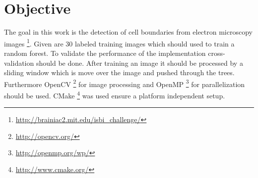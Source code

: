 \section{Objective}
\label{sec:objective}

The goal in this work is the detection of cell boundaries from electron microscopy images \footnote{\label{foot:1} \url{http://brainiac2.mit.edu/isbi_challenge/}}. Given are 30 labeled training images which should used to train a random forest.
To validate the performance of the implementation cross-validation should be done.
After training an image it should be processed by a sliding window which is move over the image and pushed through the trees.
Furthermore OpenCV \footnote{\label{foot:2} \url{http://opencv.org/}} for image processing and OpenMP \footnote{\label{foot:3} \url{http://openmp.org/wp/}} for parallelization should be used. CMake \footnote{\label{foot:4} \url{http://www.cmake.org/}} was used ensure a platform independent setup.